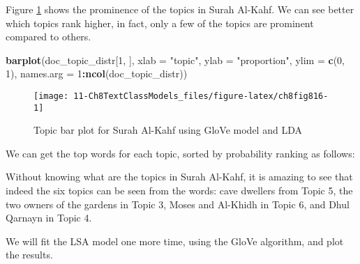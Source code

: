\documentclass[
]{article}
\newenvironment{Shaded}{\begin{snugshade}}{\end{snugshade}}
\newcommand{\AttributeTok}[1]{\textcolor[rgb]{0.13,0.29,0.53}{#1}}
\newcommand{\DecValTok}[1]{\textcolor[rgb]{0.00,0.00,0.81}{#1}}
\newcommand{\FunctionTok}[1]{\textcolor[rgb]{0.13,0.29,0.53}{\textbf{#1}}}
\newcommand{\NormalTok}[1]{#1}
\newcommand{\SpecialCharTok}[1]{\textcolor[rgb]{0.81,0.36,0.00}{\textbf{#1}}}
\newcommand{\StringTok}[1]{\textcolor[rgb]{0.31,0.60,0.02}{#1}}
\begin{document}
\normalsize

Figure \ref{fig:ch8fig816} shows the prominence of the topics in Surah Al-Kahf. We can see better which topics rank higher, in fact, only a few of the topics are prominent compared to others.

\begin{Shaded}
\begin{Highlighting}[]
\FunctionTok{barplot}\NormalTok{(doc\_topic\_distr[}\DecValTok{1}\NormalTok{, ], }\AttributeTok{xlab =} \StringTok{"topic"}\NormalTok{, }
        \AttributeTok{ylab =} \StringTok{"proportion"}\NormalTok{, }\AttributeTok{ylim =} \FunctionTok{c}\NormalTok{(}\DecValTok{0}\NormalTok{, }\DecValTok{1}\NormalTok{), }
        \AttributeTok{names.arg =} \DecValTok{1}\SpecialCharTok{:}\FunctionTok{ncol}\NormalTok{(doc\_topic\_distr))}
\end{Highlighting}
\end{Shaded}

\begin{figure}

{\centering \texttt{[image: 11-Ch8TextClassModels\_files/figure-latex/ch8fig816-1]} 

}

\caption{Topic bar plot for Surah Al-Kahf using GloVe model and LDA}\label{fig:ch8fig816}
\end{figure}

We can get the top words for each topic, sorted by probability ranking as follows:

\footnotesize

\begin{Shaded}
\end{Shaded}

\normalsize

Without knowing what are the topics in Surah Al-Kahf, it is amazing to see that indeed the six topics can be seen from the words: cave dwellers from Topic 5, the two owners of the gardens in Topic 3, Moses and Al-Khidh in Topic 6, and Dhul Qarnayn in Topic 4.

We will fit the LSA model one more time, using the GloVe algorithm, and plot the results.
\end{document}
